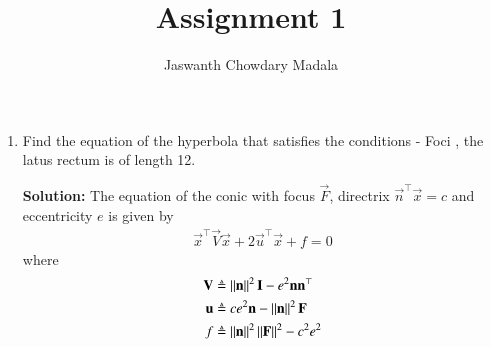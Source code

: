 \documentclass[journal,12pt,twocolumn]{IEEEtran}
\begin{document}
\vspace{3cm}


\title{Assignment 1}
\author{Jaswanth Chowdary Madala}





\maketitle

\newpage


\bigskip

\renewcommand{\thefigure}{\theenumi}
\renewcommand{\thetable}{\theenumi}


\begin{enumerate}
\item Find the equation of the hyperbola that satisfies the conditions - Foci , the latus rectum is of length 12.

\textbf{Solution:}
The equation of the conic with focus $\vec{F}$, directrix $\vec{n}^\top\vec{x} = c$ and eccentricity $e$ is given by
\begin{align}
\vec{x}^\top\vec{V}\vec{x} + 2\vec{u}^\top\vec{x} + f = 0
\label{eq:1}
\end{align}
where
\begin{align}
\mathbf{V} &\triangleq \left\lVert\mathbf{n}\right\rVert^2\mathbf{I} - e^2\mathbf{n}\mathbf{n}^\top \label{eq:2} \\
\mathbf{u} &\triangleq ce^2\mathbf{n} - \left\lVert\mathbf{n}\right\rVert^2\mathbf{F} \label{eq:3} \\
f &\triangleq \left\lVert\mathbf{n}\right\rVert^2\left\lVert\mathbf{F}\right\rVert^2 - c^2e^2 \label{eq:4}
\end{align}


\end{enumerate}
\end{document}
